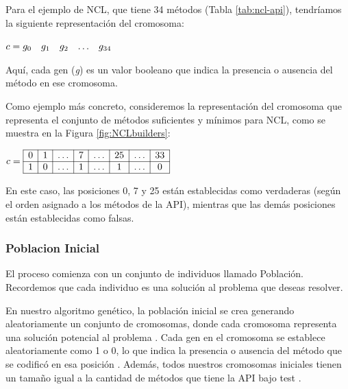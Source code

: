 Para el ejemplo de NCL, que tiene 34 métodos (Tabla \ref{tab:ncl-api}), tendríamos la siguiente representación del cromosoma:

\begin{center}
$c = \begin{array}{@{}cccccc@{}}
\scriptsize g_0 & \scriptsize g_1 & \scriptsize g_2 & \ldots & \scriptsize g_{34}
\end{array}$
\end{center}

Aquí, cada gen (\emph{g}) es un valor booleano que indica la presencia o
ausencia del método en ese cromosoma. 

Como ejemplo más concreto, consideremos la representación del cromosoma que representa el conjunto de métodos suficientes y mínimos para NCL, como se muestra en la Figura \ref{fig:NCLbuilders}:
\begin{center}
$c = \begin{array}{|*{8}{c|}}
\hline
0 & 1 & \ldots & 7 & \ldots & 25 & \ldots & 33 \\
\hline
1 & 0 & \ldots & 1 & \ldots & 1 & \ldots & 0 \\
\hline
\end{array}$
\end{center}

En este caso, las posiciones 0, 7 y 25 están establecidas como verdaderas (según el orden asignado a los métodos de la API), mientras que las demás posiciones están establecidas como falsas.


\subsubsection{Poblacion Inicial }

El proceso comienza con un conjunto de individuos llamado Población. Recordemos
que cada individuo es una solución  al problema que deseas resolver.

En nuestro algoritmo genético, la población inicial se crea generando
aleatoriamente un conjunto de cromosomas, donde cada cromosoma representa una
solución potencial al problema . Cada gen
en el cromosoma se establece aleatoriamente como 1 o 0, lo que indica la
presencia o ausencia del método que se codificó en esa posición .
Además, todos nuestros cromosomas iniciales tienen un tamaño igual a la cantidad
de métodos que tiene la API bajo test .

